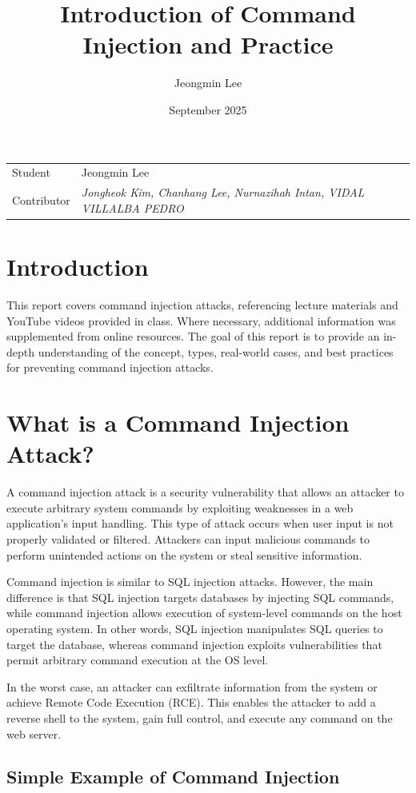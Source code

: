 \documentclass{article}
\title{Introduction of Command Injection and Practice}
\author{Jeongmin Lee}
\date{September 2025}
\begin{document}
\maketitle

\noindent\begin{tabular}{@{}ll}
  Student & Jeongmin Lee\\
  Contributor & \textit{Jongheok Kim, Chanhang Lee, Nurnazihah Intan, VIDAL VILLALBA PEDRO}\\
\end{tabular}

\section*{Introduction}
This report covers command injection attacks, referencing lecture materials and YouTube videos provided in class. Where necessary, additional information was supplemented from online resources. The goal of this report is to provide an in-depth understanding of the concept, types, real-world cases, and best practices for preventing command injection attacks.

\section*{What is a Command Injection Attack?}
A command injection attack is a security vulnerability that allows an attacker to execute arbitrary system commands by exploiting weaknesses in a web application's input handling.
This type of attack occurs when user input is not properly validated or filtered.
Attackers can input malicious commands to perform unintended actions on the system or steal sensitive information.

Command injection is similar to SQL injection attacks. However, the main difference is that SQL injection targets databases by injecting SQL commands, while command injection allows execution of system-level commands on the host operating system.
In other words, SQL injection manipulates SQL queries to target the database, whereas command injection exploits vulnerabilities that permit arbitrary command execution at the OS level.

In the worst case, an attacker can exfiltrate information from the system or achieve Remote Code Execution (RCE).
This enables the attacker to add a reverse shell to the system, gain full control, and execute any command on the web server.

\subsection*{Simple Example of Command Injection}
\end{document}
